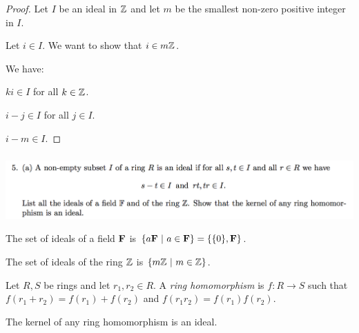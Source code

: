 \begin{proof}
  Let $I$ be an ideal in $\mathbb{Z}$ and let $m$ be the smallest non-zero positive integer in $I$.



  Let $i \in I$. We want to show that $i \in m\mathbb{Z}$.

  We have:

  $ki \in I$ for all $k \in \mathbb{Z}$.

  $i - j \in I$ for all $j \in I$.

  $i - m \in I$.





\end{proof}


\newpage
\subsubsection{} %
\begin{mdframed}
  \includegraphics[width=400pt]{img/linear-algebra-a0-1-5-a.png}\\
\end{mdframed}

The set of ideals of a field $\mathbf{F}$ is $\{a\mathbf{F} ~|~ a \in \mathbf{F}\} = \{\{0\}, \mathbf{F}\}$.

The set of ideals of the ring $\mathbb{Z}$ is $\{m\mathbb{Z} ~|~ m \in \mathbb{Z}\}$.


\begin{definition*}
  Let $R, S$ be rings and let $r_1, r_2 \in R$. A \emph{ring homomorphism} is $f:R \to S$ such that
  $f(r_1 + r_2) = f(r_1) + f(r_2)$ and $f(r_1r_2) = f(r_1)f(r_2)$.
\end{definition*}

\begin{claim*}
  The kernel of any ring homomorphism is an ideal.
\end{claim*}

